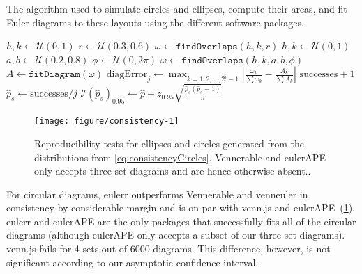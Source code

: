 \documentclass[
  oneside,
  openany,
  numbers=noendperiod,
  parskip=half,
  bibliography=totoc
]{scrbook}\usepackage[]{graphicx}\usepackage{xcolor}
\newenvironment{knitrout}{}{} %
\newcommand{\pkg}[1]{{\fontseries{b}\selectfont #1}}
\begin{document}
\begin{algorithm}
\caption{The algorithm used to simulate circles and ellipses, compute their
areas, and fit Euler diagrams to these layouts using the different software packages.}
\label{alg:consistency}
\begin{algorithmic}
      \State $h,k    \gets \mathcal{U}(0, 1)$
      \State $r      \gets \mathcal{U}(0.3, 0.6)$
      \State $\omega \gets \mathtt{findOverlaps}(h, k, r)$
      \State $h,k    \gets \mathcal{U}(0, 1)$
      \State $a,b    \gets \mathcal{U}(0.2, 0.8)$
      \State $\phi   \gets \mathcal{U}(0, 2\pi)$
      \State $\omega \gets \mathtt{findOverlaps}(h, k, a, b, \phi)$
    \EndIf
    \State $A \gets \mathtt{ fitDiagram}(\omega)$
    \State $\text{diagError}_j \gets \max_{k=1,2,\dots,2^i-1} \left| \frac{\omega_k}{\sum \omega_k} - \frac{A_k}{\sum A_k} \right|$
      \State $\text{successes} + 1$
    \EndIf
      \State $\hat{p}_s \gets \text{successes}/j$
      \State $\mathcal{I}(\hat{p}_s)_{0.95} \gets \hat{p} \pm z_{0.95}\sqrt{\frac{\hat{p}_s(\hat{p}_s-1)}{n}}$
    \EndFor
  \EndWhile
\EndFor
\end{algorithmic}
\end{algorithm}

\begin{figure}[bhtp]

\begin{knitrout}\small
{}\color{fgcolor}

{\centering \texttt{[image: figure/consistency-1]} 

}



\end{knitrout}
\caption{Reproducibility tests for ellipses and circles generated from the
distributions from \eqref{eq:consistencyCircles}. \pkg{Vennerable}
and \pkg{eulerAPE} only accepts three-set diagrams and are hence otherwise
absent..\label{fig:consistency}}
\end{figure}



For circular diagrams, \pkg{eulerr} outperforms \pkg{Vennerable} and \pkg{venneuler} in
consistency by considerable margin and is on par with \pkg{venn.js} and
\pkg{eulerAPE}~(\cref{fig:consistency}). \pkg{eulerr} and \pkg{eulerAPE} are
the only packages that successfully fits all of the circular diagrams (although
\pkg{eulerAPE} only accepts a subset of our three-set diagrams). \pkg{venn.js}
fails for 4 sets out of
6000 diagrams. This difference,
however, is not significant according to our asymptotic confidence interval.
\end{document}
